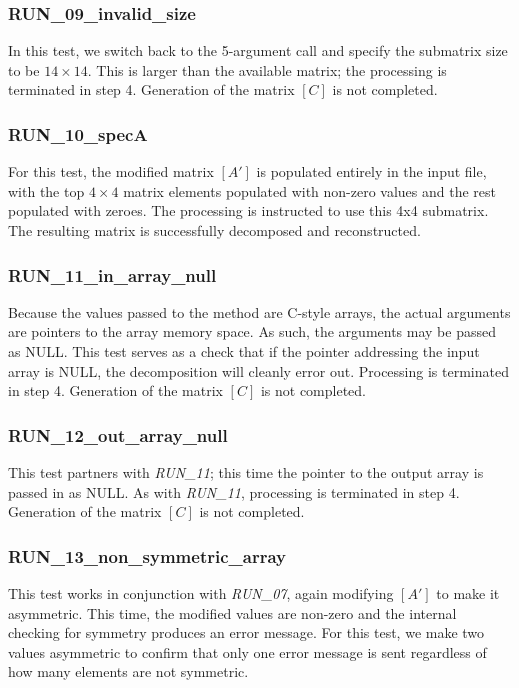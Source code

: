 \documentclass[11pt,fleqn]{report}
\begin{document}
\subsubsection{RUN\_09\_invalid\_size}
In this test, we switch back to the 5-argument call and specify the submatrix
size to be $14 \times 14$. This is larger than the available matrix; the
processing
is terminated in step 4. Generation of the matrix $[C]$ is not completed.


\subsubsection{RUN\_10\_specA}
For this test, the modified matrix $[A']$ is populated entirely in the
input file, with the top $4 \times 4$ matrix elements populated with non-zero
values and the rest populated with zeroes. The processing is instructed to use
this 4x4 submatrix. The resulting matrix is successfully decomposed and
reconstructed.

\subsubsection{RUN\_11\_in\_array\_null}
Because the values passed to the method are C-style arrays, the actual
arguments are pointers to the array memory space. As such, the arguments may
be passed as NULL. This test serves as a check that if the pointer addressing
the input array is NULL, the decomposition will cleanly error out. Processing
is terminated in step 4. Generation of the matrix $[C]$ is not completed.


\subsubsection{RUN\_12\_out\_array\_null}
This test partners with \textit{RUN\_11}; this time the pointer to the output
array is passed in as NULL. As with \textit{RUN\_11}, processing
is terminated in step 4. Generation of the matrix $[C]$ is not completed.

\subsubsection{RUN\_13\_non\_symmetric\_array}
This test works in conjunction with \textit{RUN\_07}, again modifying $[A']$
to make it asymmetric. This time, the modified values are non-zero and the
internal checking for symmetry produces an error message. For this test, we
make two values asymmetric to confirm that only one error message is sent
regardless of how many elements are not symmetric.
\end{document}
